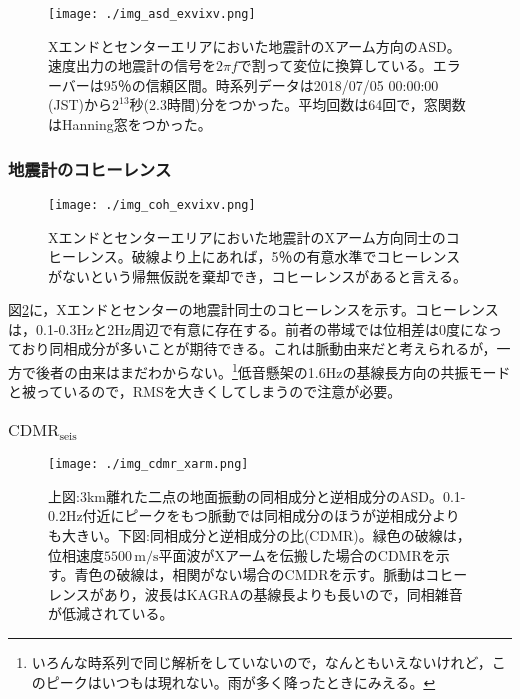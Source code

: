 \begin{figure}[H]
  \begin{center}
    \texttt{[image: ./img\_asd\_exvixv.png]}
  \end{center}
  \caption{Xエンドとセンターエリアにおいた地震計のXアーム方向のASD。速度出力の地震計の信号を$2\pi{f}$で割って変位に換算している。エラーバーは95％の信頼区間。時系列データは2018/07/05 00:00:00 (JST)から$2^{13}$秒(2.3時間)分をつかった。平均回数は64回で，窓関数はHanning窓をつかった。}\label{img:img1}
\end{figure}


\subsubsection{地震計のコヒーレンス}
\begin{figure}[H]
  \begin{center}
    \texttt{[image: ./img\_coh\_exvixv.png]}
  \end{center}
  \caption{Xエンドとセンターエリアにおいた地震計のXアーム方向同士のコヒーレンス。破線より上にあれば，5％の有意水準でコヒーレンスがないという帰無仮説を棄却でき，コヒーレンスがあると言える。}\label{img:img2}
\end{figure}


図\ref{img:img2}に，Xエンドとセンターの地震計同士のコヒーレンスを示す。コヒーレンスは，0.1-0.3Hzと2Hz周辺で有意に存在する。前者の帯域では位相差は0度になっており同相成分が多いことが期待できる。これは脈動由来だと考えられるが，一方で後者の由来はまだわからない。\footnote[8]{いろんな時系列で同じ解析をしていないので，なんともいえないけれど，このピークはいつもは現れない。雨が多く降ったときにみえる。}低音懸架の1.6Hzの基線長方向の共振モードと被っているので，RMSを大きくしてしまうので注意が必要。


\subsubsection{$\mathrm{CDMR_{seis}}$}
\begin{figure}[H]
  \begin{center}
    \texttt{[image: ./img\_cdmr\_xarm.png]}
  \end{center}
  \caption{上図:3km離れた二点の地面振動の同相成分と逆相成分のASD。0.1-0.2Hz付近にピークをもつ脈動では同相成分のほうが逆相成分よりも大きい。下図:同相成分と逆相成分の比(CDMR)。緑色の破線は，位相速度$5500\, \mathrm{m/s}$平面波がXアームを伝搬した場合のCDMRを示す。青色の破線は，相関がない場合のCMDRを示す。脈動はコヒーレンスがあり，波長はKAGRAの基線長よりも長いので，同相雑音が低減されている。}\label{img:img3}
\end{figure}


